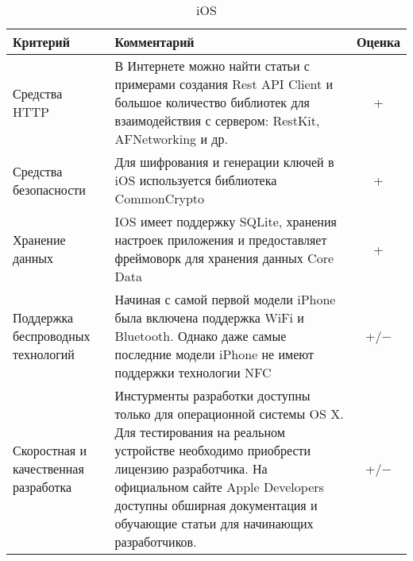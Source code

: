 \bgroup %
\def\arraystretch{1.5}%
  \begin{longtable}{| p{} | p{} | c |} 
  \caption{iOS} %
  \hline
    Критерий & Комментарий & Оценка \\
  \hline
    Средства HTTP

    & В Интернете можно найти статьи с примерами создания Rest API Client и большое количество библиотек для взаимодействия с сервером: RestKit, AFNetworking и др. 
    & + \\
  \hline
    Средства безопасности

    & Для шифрования и генерации ключей в iOS используется библиотека CommonCrypto
    
    & + \\
  \hline
    Хранение данных

    & IOS имеет поддержку SQLite, хранения настроек приложения и предоставляет фреймоворк для хранения данных Core Data

    & + \\
  \hline
    Поддержка беспроводных технологий 
    
    & Начиная с самой первой модели iPhone была включена поддержка WiFi и Bluetooth.  Однако даже самые последние модели iPhone не имеют поддержки технологии NFC

    & +/$-$ \\
  \hline
    Скоростная и качественная разработка
    
    & Инстурменты разработки доступны только для операционной системы OS X. Для тестирования на реальном устройстве необходимо приобрести лицензию разработчика. На официальном сайте Apple Developers доступны обширная документация и обучающие статьи для начинающих разработчиков.
    & +/$-$ \\
  \hline

  \end{longtable}
\egroup %

\pagebreak

